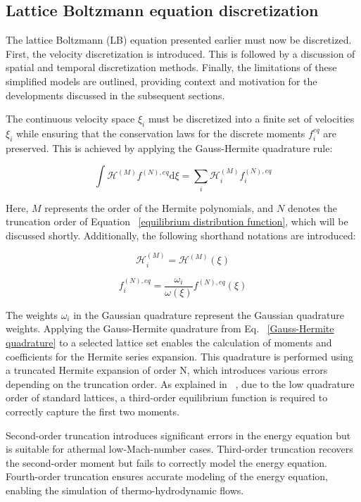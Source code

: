 \subsection{Lattice Boltzmann equation discretization}

The lattice Boltzmann (LB) equation presented earlier must now be discretized.
First, the velocity discretization is introduced. This is followed by a
discussion of spatial and temporal discretization methods. Finally, the
limitations of these simplified models are outlined, providing context and
motivation for the developments discussed in the subsequent sections.

The continuous velocity space $\xi_i$ must be discretized into a finite set of
velocities $\xi_i$ while ensuring that the conservation laws for the discrete
moments $f_i^{eq}$ are preserved. This is achieved by applying the Gauss-Hermite
quadrature rule:

\begin{equation}
	\int \mathcal{H}^{(M)}f^{(N),eq}\mathrm{d}\xi = \sum_i \mathcal{H}_i^{(M)}f_i^{(N),eq}
	\label{Gauss-Hermite quadrature}
\end{equation}

Here, $M$ represents the order of the Hermite polynomials, and $N$ denotes the
truncation order of Equation ~\ref{equilibrium distribution function}, which
will be discussed shortly. Additionally, the following shorthand notations are
introduced:

\begin{equation}
	\mathcal{H}_i^{(M)} = \mathcal{H}^{(M)}(\xi) 
\end{equation}

\begin{equation}
	f_i^{(N),eq} = \frac{\omega_i}{\omega(\xi)}f^{(N),eq}(\xi) 
\end{equation}

The weights $\omega_i$ in the Gaussian quadrature represent the Gaussian
quadrature weights. Applying the Gauss-Hermite quadrature from Eq.
~\ref{Gauss-Hermite quadrature} to a selected lattice set enables the
calculation of moments and coefficients for the Hermite series expansion. This
quadrature is performed using a truncated Hermite expansion of order N, which
introduces various errors depending on the truncation order. As explained in
~\cite{farag2022modelisation}, due to the low quadrature order of standard
lattices, a third-order equilibrium function is required to correctly capture
the first two moments.

    Second-order truncation introduces significant errors in the energy equation
    but is suitable for athermal low-Mach-number cases. Third-order truncation
    recovers the second-order moment but fails to correctly model the energy
    equation. Fourth-order truncation ensures accurate modeling of the energy
    equation, enabling the simulation of thermo-hydrodynamic flows.

